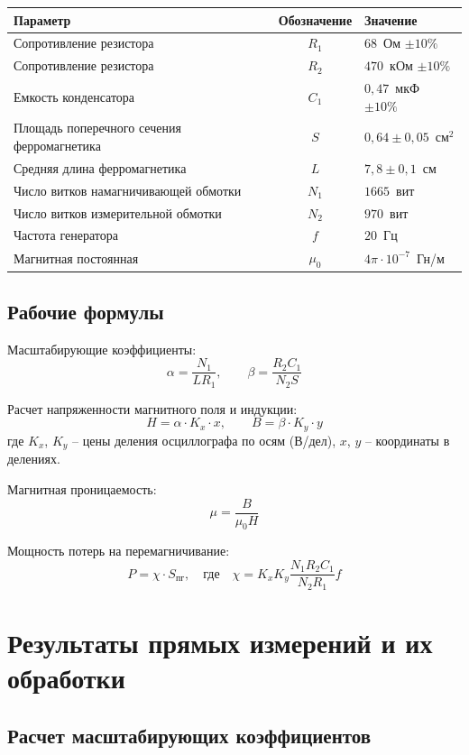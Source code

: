 \begin{center}
\begin{tabular}{|l|c|l|}
\hline
\textbf{Параметр} & \textbf{Обозначение} & \textbf{Значение} \\
\hline
Сопротивление резистора & $R_1$ & $68$~Ом $\pm 10\%$ \\
\hline
Сопротивление резистора & $R_2$ & $470$~кОм $\pm 10\%$ \\
\hline
Емкость конденсатора & $C_1$ & $0{,}47$~мкФ $\pm 10\%$ \\
\hline
Площадь поперечного сечения ферромагнетика & $S$ & $0{,}64 \pm 0{,}05$~см$^2$ \\
\hline
Средняя длина ферромагнетика & $L$ & $7{,}8 \pm 0{,}1$~см \\
\hline
Число витков намагничивающей обмотки & $N_1$ & $1665$~вит \\
\hline
Число витков измерительной обмотки & $N_2$ & $970$~вит \\
\hline
Частота генератора & $f$ & $20$~Гц \\
\hline
Магнитная постоянная & $\mu_0$ & $4\pi \cdot 10^{-7}$~Гн/м \\
\hline
\end{tabular}
\end{center}

\subsection{Рабочие формулы}

Масштабирующие коэффициенты:
\[
\alpha = \frac{N_1}{L R_1}, \qquad 
\beta = \frac{R_2 C_1}{N_2 S}
\]

Расчет напряженности магнитного поля и индукции:
\[
H = \alpha \cdot K_x \cdot x, \qquad B = \beta \cdot K_y \cdot y
\]
где $K_x$, $K_y$ -- цены деления осциллографа по осям (В/дел), $x$, $y$ -- координаты в делениях.

Магнитная проницаемость:
\[
\mu = \frac{B}{\mu_0 H}
\]

Мощность потерь на перемагничивание:
\[
P = \chi \cdot S_{\text{пг}}, \quad \text{где} \quad 
\chi = K_x K_y \frac{N_1 R_2 C_1}{N_2 R_1} f
\]

\section{Результаты прямых измерений и их обработки}

\subsection{Расчет масштабирующих коэффициентов}

